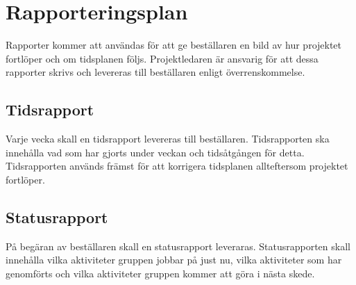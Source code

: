 \section{Rapporteringsplan}
Rapporter kommer att användas för att ge beställaren en bild av hur projektet fortlöper och om tidsplanen följs. Projektledaren är ansvarig för att dessa rapporter skrivs och levereras till beställaren enligt överrenskommelse.

\subsection{Tidsrapport}
Varje vecka skall en tidsrapport levereras till beställaren. Tidsrapporten ska innehålla vad som har gjorts under veckan och tidsåtgången för detta. Tidsrapporten används främst för att korrigera tidsplanen allteftersom projektet fortlöper.

\subsection{Statusrapport}
På begäran av beställaren skall en statusrapport leveraras. Statusrapporten skall innehålla vilka aktiviteter gruppen jobbar på just nu, vilka aktiviteter som har genomförts och vilka aktiviteter gruppen kommer att göra i nästa skede.
